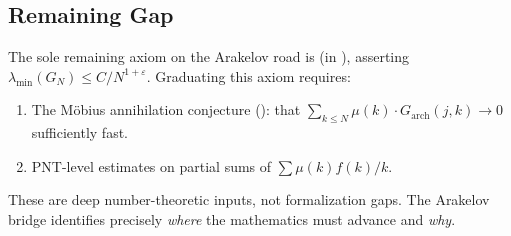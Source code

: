 \subsection{Remaining Gap}

The sole remaining axiom on the Arakelov road is
 (in ),
asserting $\lambda_{\min}(G_N) \leq C/N^{1+\varepsilon}$. Graduating
this axiom requires:
\begin{enumerate}
  \item The M\"obius annihilation conjecture ():
    that $\sum_{k \leq N} \mu(k) \cdot G_{\mathrm{arch}}(j,k) \to 0$
    sufficiently fast.
  \item PNT-level estimates on partial sums of
    $\sum \mu(k) f(k) / k$.
\end{enumerate}
These are deep number-theoretic inputs, not formalization gaps.
The Arakelov bridge identifies precisely \emph{where} the
mathematics must advance and \emph{why}.
